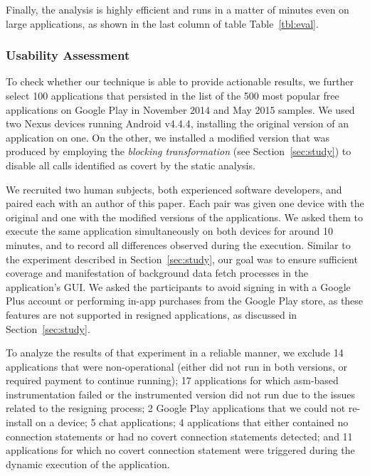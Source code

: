 Finally, the analysis is highly efficient and
runs in a matter of minutes even on large applications, as shown in
the last column of table Table~\ref{tbl:eval}.



\subsubsection{Usability Assessment}
To check whether our technique is able to provide actionable results, we further select 100 applications that persisted in the list of the 500 most popular free applications on Google Play in November 2014 and May 2015 samples. 
We used two Nexus devices running Android v4.4.4, installing the original version of an application on one. On the other, we installed a modified version that was produced by employing the \emph{blocking transformation} (see Section~\ref{sec:study}) to disable all calls identified as covert by the static analysis. 

We recruited two human subjects, both experienced software developers, and paired each with an author of this paper.
Each pair was given one device with the original and one with the modified versions of the applications. We asked them to execute the same application simultaneously on both devices for around 10 minutes, and to record all differences observed during the execution.
Similar to the experiment described in Section~\ref{sec:study}, our goal was to ensure sufficient coverage and manifestation of background data fetch processes in the application's GUI.
We asked the participants to avoid signing in with a Google Plus account or performing in-app purchases from the Google Play store, as these features are not supported in resigned applications, as discussed in Section~\ref{sec:study}.

To analyze the results of that experiment in a reliable manner, we exclude 14 applications that were non-operational (either did not run in both versions, or required payment to continue running);
 17 applications for which asm-based instrumentation failed or the instrumented version did not run due to the issues related to the resigning process;
 2 Google Play applications that we could not re-install on a device;
5 chat applications;
4 applications that either contained no connection statements or had no covert connection statements detected;
and 11 applications for which no covert connection statement were triggered during the dynamic execution of the application.

